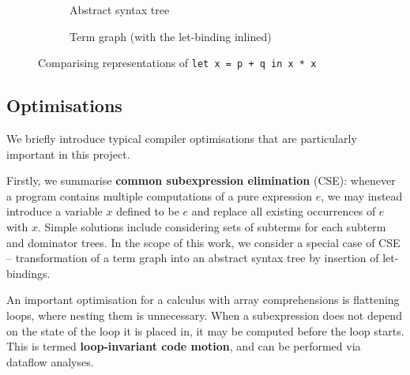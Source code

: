 \begin{figure}[ht]
\centering
\begin{subfigure}{.4\textwidth}
  \centering
{}
  \caption{Abstract syntax tree}
\end{subfigure}%
\begin{subfigure}{.4\textwidth}
  \centering
{}
  \caption{Term graph (with the let-binding inlined)}
\end{subfigure}
\caption{Comparising representations of \texttt{let x = p + q in x * x}}
\label{fig:term-repr}
\end{figure}


\subsection{Optimisations} \label{general-optimisations}

We briefly introduce typical compiler optimisations that are particularly important in this project.

Firstly, we summarise \textbf{common subexpression elimination} (CSE): whenever a program contains multiple computations of a pure expression $e$, we may instead introduce a variable $x$ defined to be $e$ and replace all existing occurrences of $e$ with $x$. Simple solutions include considering sets of subterms for each subterm and dominator trees. In the scope of this work, we consider a special case of CSE -- transformation of a term graph into an abstract syntax tree by insertion of let-bindings.

An important optimisation for a calculus with array comprehensions is flattening loops, where nesting them is unnecessary. When a subexpression does not depend on the state of the loop it is placed in, it may be computed before the loop starts. This is termed \textbf{loop-invariant code motion}, and can be performed via dataflow analyses.

